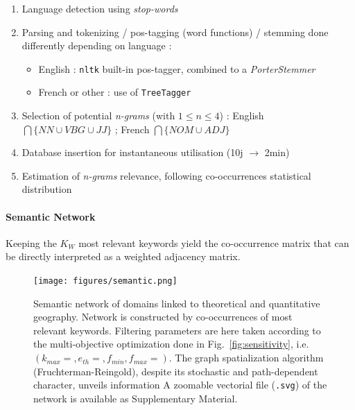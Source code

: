 \begin{enumerate}
\item Language detection using \textit{stop-words}
\item Parsing and tokenizing / pos-tagging (word functions) / stemming done differently depending on language :
\begin{itemize}
\item English : \texttt{nltk} built-in pos-tagger, combined to a \emph{PorterStemmer}
\item French or other : use of \texttt{TreeTagger}~\cite{schmid1994probabilistic}
\end{itemize}
\item Selection of potential \textit{n-grams} (with $1 \leq n \leq 4$) : English $\bigcap \{NN \cup VBG \cup JJ \}$ ;  French  $\bigcap \{NOM \cup ADJ\}$
\item Database insertion for instantaneous utilisation (10j $\rightarrow$ 2min)
\item Estimation of \textit{n-grams} relevance, following co-occurrences statistical distribution
\end{enumerate}



\paragraph{Semantic Network}





Keeping the $K_W$ most relevant keywords yield the co-occurrence matrix that can be directly interpreted as a weighted adjacency matrix. 




\begin{figure}
\hspace{-2cm}
\texttt{[image: figures/semantic.png]}
\caption[Semantic network of concepts in quantitative geography]{Semantic network of domains linked to theoretical and quantitative geography. Network is constructed by co-occurrences of most relevant keywords. Filtering parameters are here taken according to the multi-objective optimization done in Fig.~\ref{fig:sensitivity}, i.e. $(k_{max}=,e_{th}=,f_{min},f_{max}=)$. The graph spatialization algorithm (Fruchterman-Reingold), despite its stochastic and path-dependent character, unveils information  A zoomable vectorial file (\texttt{.svg}) of the network is available as Supplementary Material.}
\label{fig:quantepistemo:semanticnw}
\end{figure}




